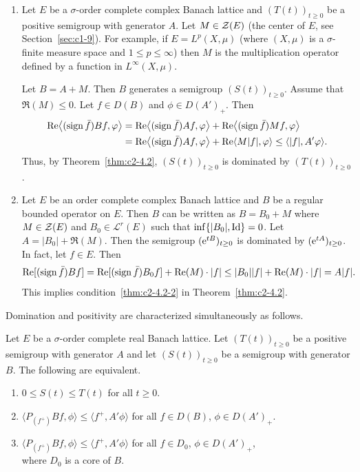 \begin{example}\label{ex:c2-4.4} 
\begin{enumerate}[\upshape (i), wide, labelindent=.25em] %
\item \label{ex:c2-4.4-1}
Let $E$ be a $\sigma$-order complete complex Banach lattice and $(T(t))_{t \geq 0}$ be a positive semigroup with generator $A$. 
Let $M \in \mathcal{Z}(E)$ (the center of\/ $E$, see Section~\ref{sec:c1-9}). 
For example, if\/ $E = L^{p}(X,\mu)$ (where $(X,\mu)$ is a $\sigma$-finite measure space and $1 \leq p \leq \infty$) then $M$ is the multiplication operator defined by a function in $L^{\infty}(X,\mu)$.

Let $B = A + M$. Then $B$ generates a semigroup $(S(t))_{t \geq 0}$.
Assume that $\Re(M) \leq 0$. Let $f \in D(B)$ and $\phi \in D(A')_{+}$. Then
\begin{align*}
\Re\mleft\langle(\sign  \bar{f})Bf,\phi\mright\rangle &= \Re\mleft\langle(\sign  \bar{f})Af,\phi\mright\rangle + \Re\mleft\langle(\sign  \bar{f})Mf,\phi\mright\rangle\\
&= \Re\mleft\langle(\sign  \bar{f})Af,\phi\mright\rangle + \Re\langle M|f|,\phi\rangle 
\leq \langle|f|,A'\phi\rangle .
\end{align*}
Thus, by Theorem~\ref{thm:c2-4.2}, $(S(t))_{t \geq 0}$ is dominated by $(T(t))_{t \geq 0}$.
\item \label{ex:c2-4.4-2}
Let $E$ be an order complete complex Banach lattice and $B$ be a regular bounded operator on $E$. 
Then $B$ can be written as $B = B_{0} + M$ where $M \in \mathcal{Z}(E)$ and $B_{0} \in \mathcal{L}^{r}(E)$ 
such that $\inf \{|B_{0}|, \operatorname{Id}\} = 0$.
Let $A = |B_{0}| + \Re(M)$. 
Then the semigroup $(\eu^{tB})_{t \geq 0}$ is dominated by $(\eu^{tA})_{t \geq 0}$. 
In fact, let $f \in E$. 
Then 
%
\[
	\Re[(\sign  \bar{f})Bf] = \Re[(\sign \bar{f})B_{0}f] + \Re(M) \cdot |f| \leq |B_{0}||f| + \Re(M) 
		\cdot |f| = A|f| .
\]
%
This implies condition~\ref{thm:c2-4.2-2} in Theorem~\ref{thm:c2-4.2}.
\end{enumerate}
\end{example}
Domination and positivity are characterized simultaneously as
follows.
\begin{proposition}\label{prop:c2-4.5}
Let $E$ be a $\sigma$-order complete real Banach lattice.
Let $(T(t))_{t \geq 0}$ be a positive semigroup with generator $A$ and let
$(S(t))_{t \geq 0}$ be a semigroup with generator $B$. The following are equivalent.
\begin{enumerate}[\upshape (a)]
\item \label{prop:c2-4.5-1}
$0 \leq S(t) \leq T(t)$ for all $t \geq 0$.
\item \label{prop:c2-4.5-2}
$\langle P_{(f^{+})}Bf,\phi\rangle \leq \langle f^{+},A'\phi\rangle$ for all $f \in D(B)$, $\phi \in D(A')_{+}$.
\item \label{prop:c2-4.5-3}
$\langle P_{(f^{+})}Bf,\phi\rangle \leq \langle f^{+},A'\phi\rangle$ for all $f \in D_{0}$, $\phi \in D(A')_{+}$,\\
where $D_{0}$ is a core of\/ $B$.
\end{enumerate}
\end{proposition}

